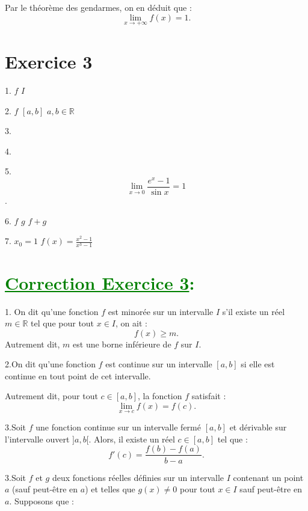 \documentclass[12pt]{article}
\begin{document}
Par le théorème des gendarmes, on en déduit que :
\[
\lim_{x \to +\infty} f(x) = 1.
\]

\section*{Exercice 3}

1.  \( f \)  \( I \)

2.  \( f \)  \([a, b]\)  \(a, b \in \mathbb{R}\) 

3. 

4. 

5.  \[ \lim_{{x \to 0}} \frac{e^{x}-1}{\sin x} = 1 \].

6.  \( f \)  \( g \)  \( f + g \)\\ 

7. \( x_0 = 1\)  \(f(x) = \frac{x^2 - 1}{x^3 - 1}\)
\section*{\textcolor{green}{\underline{Correction Exercice 3}:}}
1. On dit qu'une fonction \( f \) est minorée sur un intervalle \( I \) s'il existe un réel \( m \in \mathbb{R} \) tel que pour tout \( x \in I \), on ait :
\[
f(x) \geq m.
\]
Autrement dit, \( m \) est une borne inférieure de \( f \) sur \( I \).


2.On dit qu'une fonction \( f \) est continue sur un intervalle \([a, b]\) si elle est continue en tout point de cet intervalle.

Autrement dit, pour tout \( c \in [a, b] \), la fonction \( f \) satisfait :
\[
\lim_{x \to c} f(x) = f(c).
\]

3.Soit \( f \) une fonction continue sur un intervalle fermé \([a, b]\) et dérivable sur l'intervalle ouvert \( ]a, b[ \). Alors, il existe un réel \( c \in [a, b] \) tel que :
\[
f'(c) = \frac{f(b) - f(a)}{b - a}.
\]

3.Soit \( f \) et \( g \) deux fonctions réelles définies sur un intervalle \( I \) contenant un point \( a \) (sauf peut-être en \( a \)) et telles que \( g(x) \neq 0 \) pour tout \( x \in I \) sauf peut-être en \( a \). Supposons que :
\end{document}
